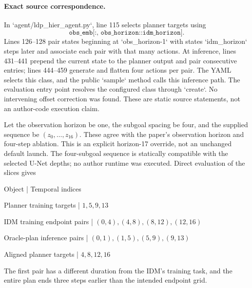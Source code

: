 \documentclass[10pt]{article}
\begin{document}
\paragraph*{Exact source correspondence.}\mbox{}\par
In `agent/ldp\_hier\_agent.py`, line 115 selects planner targets using \[\texttt{obs\_emb[:, obs\_horizon::idm\_horizon]}.\] Lines 126–128 pair states beginning at `obs\_horizon-1` with states `idm\_horizon` steps later and associate each pair with that many actions. At inference, lines 431–441 prepend the current state to the planner output and pair consecutive entries; lines 444–459 generate and flatten four actions per pair. The YAML selects this class, and the public `sample` method calls this inference path. The evaluation entry point resolves the configured class through `create`. No intervening offset correction was found. These are static source statements, not an author-code execution claim.\par
Let the observation horizon be one, the subgoal spacing be four, and the supplied sequence be \((z_0,\ldots,z_{16})\). These agree with the paper’s observation horizon and four-step ablation. This is an explicit horizon-17 override, not an unchanged default launch. The four-subgoal sequence is statically compatible with the selected U-Net depths; no author runtime was executed. Direct evaluation of the slices gives\par
Object | Temporal indices\par
Planner training targets | \(1,5,9,13\)\par
IDM training endpoint pairs | \((0,4),(4,8),(8,12),(12,16)\)\par
Oracle-plan inference pairs | \((0,1),(1,5),(5,9),(9,13)\)\par
Aligned planner targets | \(4,8,12,16\)\par
The first pair has a different duration from the IDM’s training task, and the entire plan ends three steps earlier than the intended endpoint grid.\par
\end{document}
